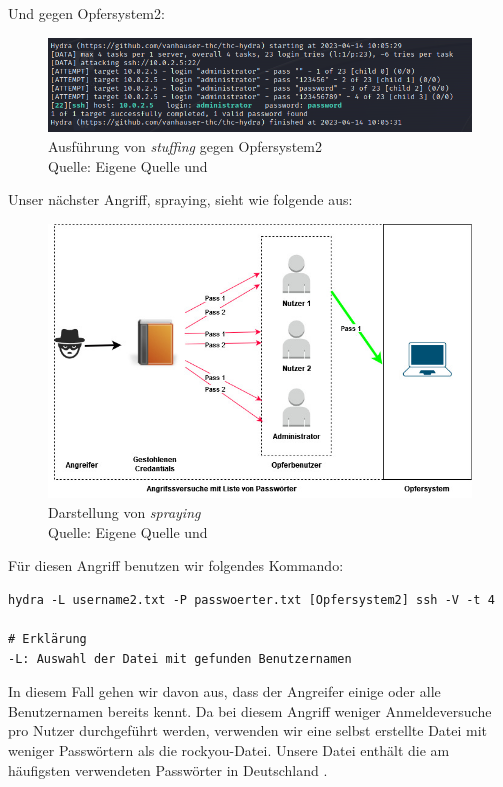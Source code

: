 Und gegen Opfersystem2:
\begin{figure}[H]
   \centering
   \includegraphics[width=1\textwidth]{assets/stuffing_kali2.png}
   \caption[Ausführung von \textit{\gls{stuffing}} gegen Opfersystem2]
   {Ausführung von \textit{\gls{stuffing}} gegen Opfersystem2\\Quelle: Eigene Quelle und \citep{Nguyen_stuffing}}
   \centering
\end{figure}

\newpage
Unser nächster Angriff, \gls{spraying}, sieht wie folgende aus:
\begin{figure}[H]
   \centering
   \includegraphics[width=1\textwidth]{assets/Spraying.jpg}
   \caption[Darstellung von \textit{\gls{spraying}}]
   {Darstellung von \textit{\gls{spraying}}\\Quelle: Eigene Quelle und \citep{Swathi_spraxy}}
   \centering
\end{figure}

Für diesen Angriff benutzen wir folgendes Kommando:
{
\begin{Verbatim}[frame=single]
hydra -L username2.txt -P passwoerter.txt [Opfersystem2] ssh -V -t 4

# Erklärung
-L: Auswahl der Datei mit gefunden Benutzernamen
\end{Verbatim}
}

In diesem Fall gehen wir davon aus, dass der Angreifer einige oder alle Benutzernamen bereits kennt. Da bei diesem Angriff weniger Anmeldeversuche pro Nutzer durchgeführt werden, verwenden wir eine selbst erstellte Datei mit weniger Passwörtern als die \gls{rockyou}-Datei. Unsere Datei enthält die am häufigsten verwendeten Passwörter in Deutschland \citep{silicon_passwort}.

